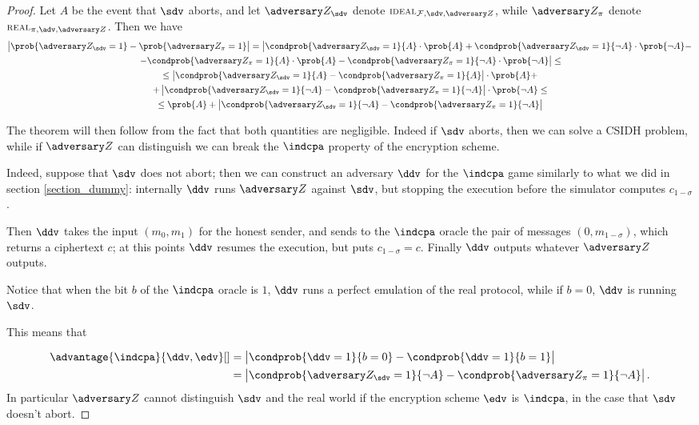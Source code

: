 \begin{proof}
    Let $A$ be the event that $\sdv$ aborts, and let $\zdv_\sdv$ denote $\textsc{\scriptsize IDEAL}_{\Fun,\sdv,\zdv}$, while $\zdv_\pi$ denote $\textsc{\scriptsize REAL}_{\pi,\adv,\zdv}$. Then we have
    \begin{multline*}
        \left|\prob{\zdv_\sdv=1}-\prob{\zdv_\pi=1}\right| = \left|\condprob{\zdv_\sdv=1}{A}\cdot\prob{A} + \condprob{\zdv_\sdv=1}{\neg A}\cdot\prob{\neg A} -\right.\\\left.- \condprob{\zdv_\pi=1}{A}\cdot\prob{A} - \condprob{\zdv_\pi=1}{\neg A}\cdot\prob{\neg A}\right|\le\\
        \le \left| \condprob{\zdv_\sdv=1}{A} - \condprob{\zdv_\pi=1}{A}\right|\cdot\prob{A}  +\\
        + \left| \condprob{\zdv_\sdv=1}{\neg A} - \condprob{\zdv_\pi=1}{\neg A}\right|\cdot\prob{\neg A} \le \\
        \le \prob{A} + \left| \condprob{\zdv_\sdv=1}{\neg A} - \condprob{\zdv_\pi=1}{\neg A}\right|
    \end{multline*}

    The theorem will then follow from the fact that both quantities are negligible. Indeed if $\sdv$ aborts, then we can solve a CSIDH problem, while if $\zdv$ can distinguish we can break the $\indcpa$ property of the encryption scheme.
    
    Indeed, suppose that $\sdv$ does not abort; then we can construct an adversary $\ddv$ for the $\indcpa$ game similarly to what we did in section \ref{section_dummy}: internally $\ddv$ runs $\zdv$ against $\sdv$, but stopping the execution before the simulator computes $c_{1-\sigma}$.
    
    Then $\ddv$ takes the input $(m_0,m_1)$ for the honest sender, and sends to the $\indcpa$ oracle the pair of messages $(0,m_{1-\sigma})$, which returns a ciphertext $c$; at this points $\ddv$ resumes the execution, but puts $c_{1-\sigma}=c$. Finally $\ddv$ outputs whatever $\zdv$ outputs.
    
    Notice that when the bit $b$ of the $\indcpa$ oracle is $1$, $\ddv$ runs a perfect emulation of the real protocol, while if $b=0$, $\ddv$ is running $\sdv$.
    
    This means that
    
    \begin{align*}
    \advantage{\indcpa}{\ddv,\edv}[] &= \left| \condprob{\ddv=1}{b=0} -  \condprob{\ddv=1}{b=1}\right|\\
    & = \left| \condprob{\zdv_\sdv=1}{\neg A} - \condprob{\zdv_\pi=1}{\neg A} \right|.
    \end{align*}
    In particular $\zdv$ cannot distinguish $\sdv$ and the real world if the encryption scheme $\edv$ is $\indcpa$, in the case that $\sdv$ doesn't abort.    
    

\end{proof}

